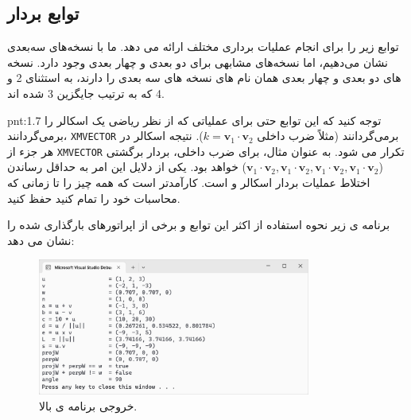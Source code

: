 \subsection{\textbf{توابع بردار}}
\label{subsec:1.6.8}
{
    \Large
    \begin{spacing}{1.5}
         توابع زیر را برای انجام عملیات برداری مختلف ارائه می دهد.
        ما با نسخه‌های سه‌بعدی نشان می‌دهیم، اما نسخه‌های مشابهی برای دو بعدی و چهار بعدی وجود دارد.
        نسخه های دو بعدی و چهار بعدی همان نام های نسخه های سه بعدی را دارند، به استثنای 2 و 4 که به ترتیب جایگزین 3 شده اند.
        \textbf{\vspace{6pt}}
        \lr{}
        \textbf{\vspace{-20pt}}
        \begin{point}{pnt:1.7}
            \Large
            توجه کنید که این توابع حتی برای عملیاتی که از نظر ریاضی یک اسکالر را برمی‌گردانند، \texttt{XMVECTOR} برمی‌گردانند (مثلاً ضرب داخلی $k=\textbf{v}_{1}\cdot\textbf{v}_{2}$).
            نتیجه اسکالر در هر جزء از \texttt{XMVECTOR} تکرار می شود. به عنوان مثال، برای ضرب داخلی، بردار برگشتی ($\textbf{v}_{1}\cdot\textbf{v}_{2},\textbf{v}_{1}\cdot\textbf{v}_{2},\textbf{v}_{1}\cdot\textbf{v}_{2},\textbf{v}_{1}\cdot\textbf{v}_{2}$) خواهد بود.
            یکی از دلایل این امر به حداقل رساندن اختلاط عملیات بردار اسکالر و  است.
            کارآمدتر است که همه چیز  را تا زمانی که محاسبات خود را تمام کنید حفظ کنید.
        \end{point}
        \textbf{\vspace{6pt}}
        برنامه ی زیر نحوه استفاده از اکثر این توابع و برخی از اپراتورهای بارگذاری شده را نشان می دهد:
        \textbf{\vspace{6pt}}
        \lr{}
        \textbf{\vspace{-30pt}}
        \begin{figure}[H]
            \centering
            \setlength{\belowcaptionskip}{-10pt}
            \includegraphics[width=0.8\textwidth]{Images/4/1/4.Session.1.1.19}
            \caption {خروجی برنامه ی بالا.}
            \label{fig:4.Session.1.1.19}
        \end{figure}
        \textbf{\vspace{-30pt}}


\end{spacing}}
